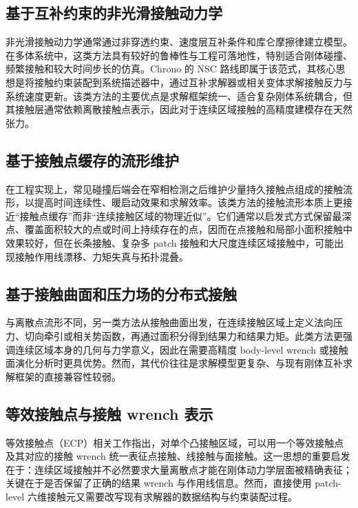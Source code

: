 \documentclass[UTF8,a4paper,11pt]{ctexart}
\begin{document}
\subsection{基于互补约束的非光滑接触动力学}

非光滑接触动力学通常通过非穿透约束、速度层互补条件和库仑摩擦律建立模型。在多体系统中，这类方法具有较好的鲁棒性与工程可落地性，特别适合刚体碰撞、频繁接触和较大时间步长的仿真。Chrono 的 NSC 路线即属于该范式，其核心思想是将接触约束装配到系统描述器中，通过互补求解器或相关变体求解接触反力与系统速度更新。该类方法的主要优点是求解框架统一、适合复杂刚体系统耦合，但其接触层通常依赖离散接触点表示，因此对于连续区域接触的高精度建模存在天然张力。

\subsection{基于接触点缓存的流形维护}

在工程实现上，常见碰撞后端会在窄相检测之后维护少量持久接触点组成的接触流形，以提高时间连续性、暖启动效果和求解效率。该类方法的接触流形本质上更接近“接触点缓存”而非“连续接触区域的物理近似”。它们通常以启发式方式保留最深点、覆盖面积较大的点或时间上持续存在的点，因而在点接触和局部小面积接触中效果较好，但在长条接触、复杂多 patch 接触和大尺度连续区域接触中，可能出现接触作用线漂移、力矩失真与拓扑混叠。

\subsection{基于接触曲面和压力场的分布式接触}

与离散点流形不同，另一类方法从接触曲面出发，在连续接触区域上定义法向压力、切向牵引或相关势函数，再通过面积分得到结果力和结果力矩。此类方法更强调连续区域本身的几何与力学意义，因此在需要高精度 body-level wrench 或接触面演化分析时更具优势。然而，其代价往往是求解模型更复杂、与现有刚体互补求解框架的直接兼容性较弱。

\subsection{等效接触点与接触 wrench 表示}

等效接触点（ECP）相关工作指出，对单个凸接触区域，可以用一个等效接触点及其对应的接触 wrench 统一表征点接触、线接触与面接触。这一思想的重要启发在于：连续区域接触并不必然要求大量离散点才能在刚体动力学层面被精确表征；关键在于是否保留了正确的结果 wrench 与作用线信息。然而，直接使用 patch-level 六维接触元又需要改写现有求解器的数据结构与约束装配过程。
\end{document}

